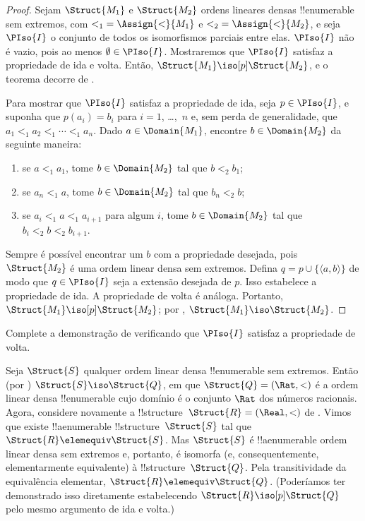 \documentclass[../../../include/open-logic-section]{subfiles}
\begin{document}
\begin{proof}
  Sejam $\Struct{M_1}$ e $\Struct{M_2}$ ordens lineares densas !!{enumerable}
  sem extremos, com ${<_1} = \Assign{<}{M_1}$ e ${<_2} =
  \Assign{<}{M_2}$, e seja $\PIso{I}$ o conjunto de todos os isomorfismos
  parciais entre elas. $\PIso{I}$ não é vazio, pois ao menos
  $\emptyset \in \PIso{I}$. Mostraremos que $\PIso{I}$ satisfaz a
  propriedade de ida e volta. Então, $\Struct{M_1} \iso[p] \Struct{M_2}$,
  e o teorema decorre de .

  Para mostrar que $\PIso{I}$ satisfaz a propriedade de ida, seja $p \in
  \PIso{I}$, e suponha que $p(a_i) = b_i$ para $i = 1$, \dots,~$n$ e,
  sem perda de generalidade, que $a_1 <_1 a_2 <_1 \cdots <_1
  a_n$. Dado $a \in \Domain{M_1}$, encontre $b \in \Domain{M_2}$ da
  seguinte maneira:
  \begin{enumerate}
  \item se $a <_1 a_1$, tome $b \in \Domain{M_2}$ tal que $b <_2
    b_1$;
  \item se $a_n <_1 a$, tome $b \in \Domain{M_2}$ tal que $b_n <_2 b$;
 \item se $a_i <_1 a <_1 a_{i+1}$ para algum $i$, tome $b \in
   \Domain{M_2}$ tal que $b_i <_2 b <_2 b_{i+1}$.
  \end{enumerate}
  Sempre é possível encontrar um $b$ com a propriedade desejada, pois
  $\Struct{M_2}$ é uma ordem linear densa sem extremos. Defina
  $q = p \cup \{ \langle a, b \rangle \}$ de modo que $q \in \PIso{I}$ seja
  a extensão desejada de $p$. Isso estabelece a propriedade de ida.
  A propriedade de volta é análoga. Portanto, $\Struct{M_1} \iso[p]
  \Struct{M_2}$; por , $\Struct{M_1} \iso
  \Struct{M_2}$.
\end{proof}

\begin{prob}
  Complete a demonstração de 
  verificando que $\PIso{I}$ satisfaz a propriedade de volta.
\end{prob}

\begin{rem}
  Seja $\Struct{S}$ qualquer ordem linear densa !!{enumerable} sem
  extremos. Então (por ) $\Struct{S} \iso
  \Struct{Q}$, em que $\Struct{Q} = (\Rat, <)$ é a ordem linear densa !!{enumerable}
  cujo domínio é o conjunto $\Rat$ dos números racionais.
  Agora, considere novamente a !!{structure}~$\Struct{R} =
  (\Real, <)$ de . Vimos que existe
  !!a{enumerable} !!{structure}~$\Struct{S}$ tal que $\Struct{R}
  \elemequiv \Struct{S}$. Mas $\Struct{S}$ é !!a{enumerable} ordem
  linear densa sem extremos e, portanto, é isomorfa (e,
  consequentemente, elementarmente equivalente) à !!{structure}~$\Struct{Q}$. Pela
  transitividade da equivalência elementar, $\Struct{R} \elemequiv
  \Struct{Q}$. (Poderíamos ter demonstrado isso diretamente estabelecendo
  $\Struct{R} \iso[p] \Struct{Q}$ pelo mesmo argumento de ida e volta.)
\end{rem}
\end{document}
